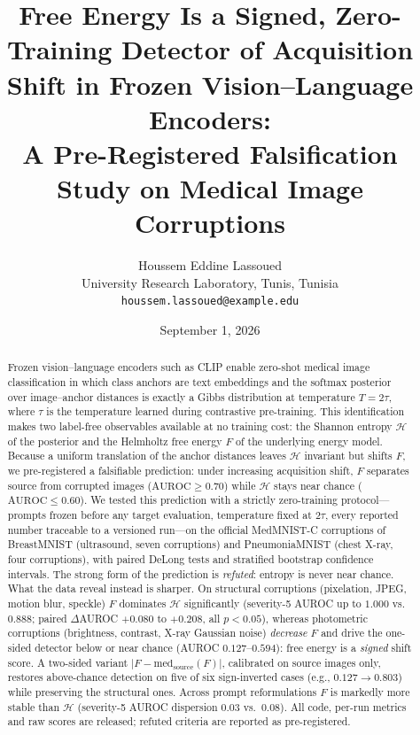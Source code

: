 \documentclass[11pt]{article}
\title{Free Energy Is a Signed, Zero-Training Detector of Acquisition Shift
in Frozen Vision--Language Encoders:\\
A Pre-Registered Falsification Study on Medical Image Corruptions}
\author{Houssem Eddine Lassoued\\
\small University Research Laboratory, Tunis, Tunisia\\
\small \texttt{houssem.lassoued@example.edu}}
\date{September 1, 2026}
\newcommand{\Hent}{\mathcal{H}}
\begin{document}
\maketitle

\begin{abstract}
Frozen vision--language encoders such as CLIP enable zero-shot medical image
classification in which class anchors are text embeddings and the softmax
posterior over image--anchor distances is exactly a Gibbs distribution at
temperature $T=2\tau$, where $\tau$ is the temperature learned during
contrastive pre-training. This identification makes two label-free observables
available at no training cost: the Shannon entropy $\Hent$ of the posterior and
the Helmholtz free energy $F$ of the underlying energy model. Because a uniform
translation of the anchor distances leaves $\Hent$ invariant but shifts $F$, we
pre-registered a falsifiable prediction: under increasing acquisition shift,
$F$ separates source from corrupted images
($\mathrm{AUROC}\!\ge\!0.70$) while $\Hent$ stays near chance
($\mathrm{AUROC}\!\le\!0.60$). We tested this prediction with a strictly
zero-training protocol---prompts frozen before any target evaluation,
temperature fixed at $2\tau$, every reported number traceable to a versioned
run---on the official MedMNIST-C corruptions of BreastMNIST (ultrasound, seven
corruptions) and PneumoniaMNIST (chest X-ray, four corruptions), with paired
DeLong tests and stratified bootstrap confidence intervals. The strong form of
the prediction is \emph{refuted}: entropy is never near chance. What the data
reveal instead is sharper. On structural corruptions (pixelation, JPEG, motion
blur, speckle) $F$ dominates $\Hent$ significantly (severity-5 AUROC up to
$1.000$ vs.\ $0.888$; paired $\Delta$AUROC $+0.080$ to $+0.208$, all
$p<0.05$), whereas photometric corruptions (brightness, contrast, X-ray
Gaussian noise) \emph{decrease} $F$ and drive the one-sided detector below or
near chance (AUROC $0.127$--$0.594$): free energy is a \emph{signed} shift score.
A two-sided variant $|F-\mathrm{med}_{\mathrm{source}}(F)|$, calibrated on
source images only, restores above-chance detection on five of six
sign-inverted cases (e.g., $0.127\!\to\!0.803$) while preserving the structural
ones. Across prompt reformulations $F$ is markedly more stable than $\Hent$
(severity-5 AUROC dispersion $0.03$ vs.\ $0.08$). All code, per-run metrics and
raw scores are released; refuted criteria are reported as pre-registered.
\end{abstract}
\end{document}
